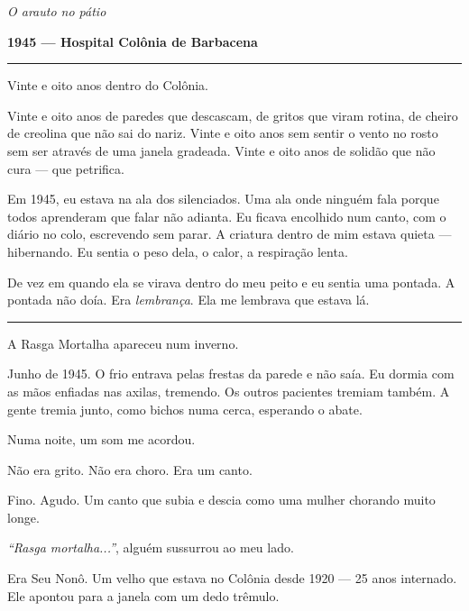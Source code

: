 
\noindent \textit{O arauto no pátio}

\noindent \textbf{1945 --- Hospital Colônia de Barbacena}

\vspace{0.5em}\noindent\rule{\textwidth}{0.5pt}\vspace{0.5em}

\noindent Vinte e oito anos dentro do Colônia.

\noindent Vinte e oito anos de paredes que descascam, de gritos que viram rotina, de cheiro de creolina que não sai do nariz. Vinte e oito anos sem sentir o vento no rosto sem ser através de uma janela gradeada. Vinte e oito anos de solidão que não cura --- que petrifica.

\noindent Em 1945, eu estava na ala dos silenciados. Uma ala onde ninguém fala porque todos aprenderam que falar não adianta. Eu ficava encolhido num canto, com o diário no colo, escrevendo sem parar. A criatura dentro de mim estava quieta --- hibernando. Eu sentia o peso dela, o calor, a respiração lenta.

\noindent De vez em quando ela se virava dentro do meu peito e eu sentia uma pontada. A pontada não doía. Era \textit{lembrança}. Ela me lembrava que estava lá.

\vspace{0.5em}\noindent\rule{\textwidth}{0.5pt}\vspace{0.5em}

\noindent A Rasga Mortalha apareceu num inverno.

\noindent Junho de 1945. O frio entrava pelas frestas da parede e não saía. Eu dormia com as mãos enfiadas nas axilas, tremendo. Os outros pacientes tremiam também. A gente tremia junto, como bichos numa cerca, esperando o abate.

\noindent Numa noite, um som me acordou.

\noindent Não era grito.
Não era choro.
Era um canto.

\noindent Fino. Agudo. Um canto que subia e descia como uma mulher chorando muito longe.

\noindent \textit{\textquotedblleft{}Rasga mortalha...\textquotedblright{}}, alguém sussurrou ao meu lado.

\noindent Era Seu Nonô. Um velho que estava no Colônia desde 1920 --- 25 anos internado. Ele apontou para a janela com um dedo trêmulo.

